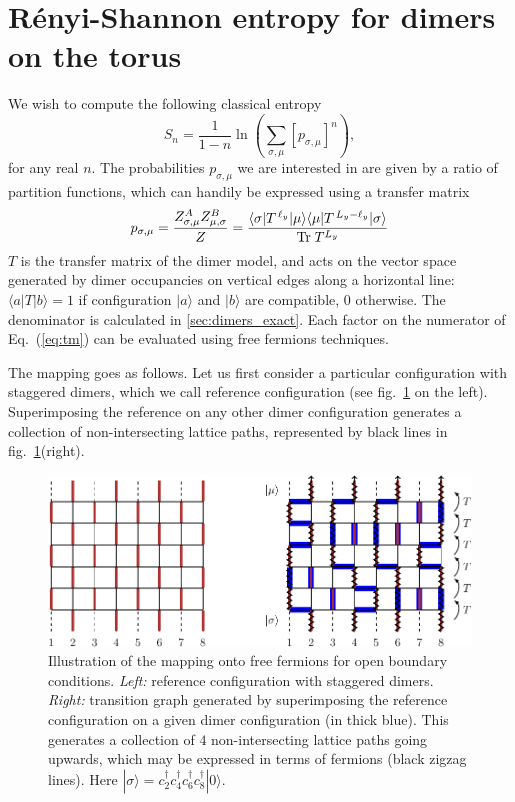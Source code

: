 \documentclass[11pt]{iopart}
\begin{document}
\section[\;\;\;\;\;\;\;\;\;\;\;\;\;\;R\'enyi-Shannon entropy on the torus]{R\'enyi-Shannon entropy for dimers on the torus}
\label{sec:lgv}
We wish to compute the following classical entropy
\begin{equation}
 S_n=\frac{1}{1-n} \ln \left(\sum_{\sigma,\mu} [p_{\sigma,\mu}]^n\right), 
\end{equation}
for any real $n$. The probabilities $p_{\sigma,\mu}$ we are interested in are given by a ratio of partition functions, which can handily be expressed using a transfer matrix
\begin{equation}\label{eq:tm}
 p_{\sigma,\mu}=\frac{Z_{\sigma,\mu}^A Z_{\mu,\sigma}^B}{Z}=\frac{\langle  \sigma|T^{\,\ell_y}|\mu\rangle\langle \mu|T^{\,L_y-\ell_y}|\sigma\rangle}{{\rm Tr}\; T^{L_y}}
\end{equation}
$T$ is the transfer matrix of the dimer model, and acts on the vector space generated by dimer occupancies on vertical edges along a horizontal line: $\langle a|T|b\rangle=1$ if configuration $|a\rangle$ and $|b\rangle$ are compatible, $0$ otherwise. The denominator is calculated in \ref{sec:dimers_exact}. Each factor on the numerator of Eq.~(\ref{eq:tm}) can be evaluated using free fermions techniques\cite{Lieb1967,Alet_dimers2,Shannonee}. 

The mapping goes as follows. Let us first consider a particular configuration with staggered dimers, which we call reference configuration (see fig.~\ref{fig:freefermions} on the left). Superimposing the reference on any other dimer configuration generates a collection of non-intersecting lattice paths, represented by black lines in fig.~\ref{fig:freefermions}(right). 
\begin{figure}[ht]
\begin{center}
\includegraphics{./figures/free_fermions.pdf}
  \end{center}
  \caption{Illustration of the mapping onto free fermions for open boundary conditions. \emph{Left:} reference configuration with staggered dimers. \emph{Right:} transition graph generated by superimposing the reference configuration on a given dimer configuration (in thick blue). This generates a collection of $4$ non-intersecting lattice paths going upwards, which may be expressed in terms of fermions (black zigzag lines). Here $|\sigma\rangle=c_2^\dag c_4^\dag c_6^\dag c_8^\dag|0\rangle$.}
  \label{fig:freefermions}
  \end{figure}
\end{document}
